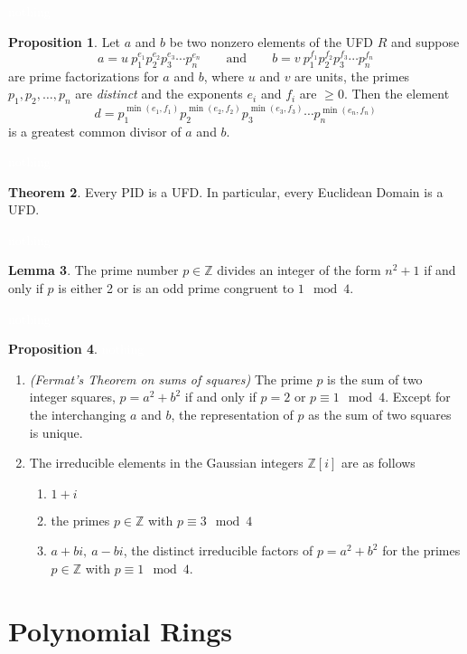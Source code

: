 \documentclass{article}
\theoremstyle{definition}
\newtheorem{thm}{Theorem}[section]
\newtheorem{lem}[thm]{Lemma}
\newtheorem{prop}[thm]{Proposition}
\newcommand{\nl}{\textcolor{white}{nothing}}
\newcommand{\Z}{\mathbb{Z}}
\begin{document}
\nl

\begin{prop}
Let $a$ and $b$ be two nonzero elements of the UFD $R$ and suppose
\[a = u\ p_1^{e_1}p_2^{e_2}p_3^{e_3}\cdots p_n^{e_n}\qquad\text{and}\qquad b = v\ p_1^{f_1}p_2^{f_2}p_3^{f_3}\cdots p_n^{f_n}\]
are prime factorizations for $a$ and $b$, where $u$ and $v$ are units, the primes $p_1,p_2,\ldots,p_n$ are \textit{distinct} and the exponents $e_i$ and $f_i$ are $\geq 0$. Then the element 
\[d = p_1^{\min(e_1,f_1)}p_2^{\min(e_2,f_2)}p_3^{\min(e_3,f_3)}\cdots p_n^{\min(e_n,f_n)}\]
is a greatest common divisor of $a$ and $b$. 
\end{prop}

\nl

\begin{thm}
Every PID is a UFD. In particular, every Euclidean Domain is a UFD. 
\end{thm}

\nl

\begin{lem}
The prime number $p\in \Z$ divides an integer of the form $n^2 + 1$ if and only if $p$ is either 2 or is an odd prime congruent to $1\mod 4$.
\end{lem}

\nl

\begin{prop}\nl
\begin{enumerate}
\item \textit{(Fermat's Theorem on sums of squares)} The prime $p$ is the sum of two integer squares, $p = a^2 + b^2$ if and only if $p = 2$ or $p\equiv 1\mod 4$. Except for the interchanging $a$ and $b$, the representation of $p$ as the sum of two squares is unique. 
\item The irreducible elements in the Gaussian integers $\Z[i]$ are as follows
\begin{enumerate}
\item $1 + i$
\item the primes $p\in \Z$ with $p\equiv 3\mod 4$
\item $a + bi,\ a-bi$, the distinct irreducible factors of $p = a^2 + b^2$ for the primes $p\in \Z$ with $p\equiv 1\mod 4$.
\end{enumerate}
\end{enumerate}
\end{prop}


\section{Polynomial Rings}
\setcounter{thm}{0}
\end{document}
